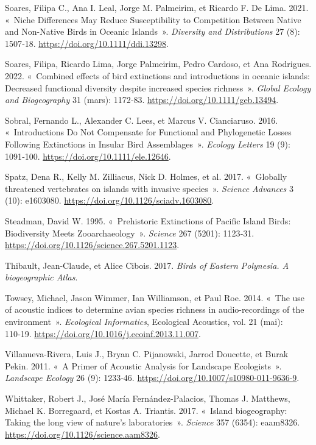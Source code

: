 \documentclass[
  french,
  11pt,
]{stylisharticle}
\newlength{\cslhangindent}
\newenvironment{CSLReferences}[2] %
 {\begin{list}{}{%
  \setlength{\itemindent}{0pt}
  \setlength{\leftmargin}{0pt}
  \setlength{\parsep}{0pt}
  \ifodd #1
   \setlength{\leftmargin}{\cslhangindent}
   \setlength{\itemindent}{-1\cslhangindent}
  \fi
  \setlength{\itemsep}{#2\baselineskip}}}
 {\end{list}}
\begin{document}
\begin{CSLReferences}{1}{1}
Soares, Filipa C., Ana I. Leal, Jorge M. Palmeirim, et Ricardo F. De
Lima. 2021. {«~Niche Differences May Reduce Susceptibility to
Competition Between Native and Non{-}Native Birds in Oceanic Islands~»}.
\emph{Diversity and Distributions} 27 (8): 1507‑18.
\url{https://doi.org/10.1111/ddi.13298}.

Soares, Filipa, Ricardo Lima, Jorge Palmeirim, Pedro Cardoso, et Ana
Rodrigues. 2022. {«~Combined effects of bird extinctions and
introductions in oceanic islands: Decreased functional diversity despite
increased species richness~»}. \emph{Global Ecology and Biogeography} 31
(mars): 1172‑83. \url{https://doi.org/10.1111/geb.13494}.

Sobral, Fernando L., Alexander C. Lees, et Marcus V. Cianciaruso. 2016.
{«~Introductions Do Not Compensate for Functional and Phylogenetic
Losses Following Extinctions in Insular Bird Assemblages~»}.
\emph{Ecology Letters} 19 (9): 1091‑100.
\url{https://doi.org/10.1111/ele.12646}.

Spatz, Dena R., Kelly M. Zilliacus, Nick D. Holmes, et al. 2017.
{«~Globally threatened vertebrates on islands with invasive species~»}.
\emph{Science Advances} 3 (10): e1603080.
\url{https://doi.org/10.1126/sciadv.1603080}.

Steadman, David W. 1995. {«~Prehistoric Extinctions of Pacific Island
Birds: Biodiversity Meets Zooarchaeology~»}. \emph{Science} 267 (5201):
1123‑31. \url{https://doi.org/10.1126/science.267.5201.1123}.

Thibault, Jean-Claude, et Alice Cibois. 2017. \emph{Birds of Eastern
Polynesia. A biogeographic Atlas}.

Towsey, Michael, Jason Wimmer, Ian Williamson, et Paul Roe. 2014. {«~The
use of acoustic indices to determine avian species richness in
audio-recordings of the environment~»}. \emph{Ecological Informatics},
Ecological Acoustics, vol. 21 (mai): 110‑19.
\url{https://doi.org/10.1016/j.ecoinf.2013.11.007}.

Villanueva-Rivera, Luis J., Bryan C. Pijanowski, Jarrod Doucette, et
Burak Pekin. 2011. {«~A Primer of Acoustic Analysis for Landscape
Ecologists~»}. \emph{Landscape Ecology} 26 (9): 1233‑46.
\url{https://doi.org/10.1007/s10980-011-9636-9}.

Whittaker, Robert J., José María Fernández-Palacios, Thomas J. Matthews,
Michael K. Borregaard, et Kostas A. Triantis. 2017. {«~Island
biogeography: Taking the long view of nature{'}s laboratories~»}.
\emph{Science} 357 (6354): eaam8326.
\url{https://doi.org/10.1126/science.aam8326}.

\end{CSLReferences}
\end{document}
